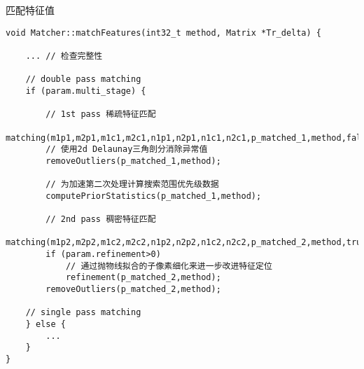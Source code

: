 \documentclass[UTF8]{ctexart}
\begin{document}
    匹配特征值
    \begin{verbatim}
void Matcher::matchFeatures(int32_t method, Matrix *Tr_delta) {

    ... // 检查完整性

    // double pass matching
    if (param.multi_stage) {

        // 1st pass 稀疏特征匹配
        matching(m1p1,m2p1,m1c1,m2c1,n1p1,n2p1,n1c1,n2c1,p_matched_1,method,false,Tr_delta);
        // 使用2d Delaunay三角剖分消除异常值
        removeOutliers(p_matched_1,method);
        
        // 为加速第二次处理计算搜索范围优先级数据
        computePriorStatistics(p_matched_1,method);      

        // 2nd pass 稠密特征匹配
        matching(m1p2,m2p2,m1c2,m2c2,n1p2,n2p2,n1c2,n2c2,p_matched_2,method,true,Tr_delta);
        if (param.refinement>0)
            // 通过抛物线拟合的子像素细化来进一步改进特征定位
            refinement(p_matched_2,method);
        removeOutliers(p_matched_2,method);

    // single pass matching
    } else {
        ...
    }
}
    \end{verbatim}
\end{document}
